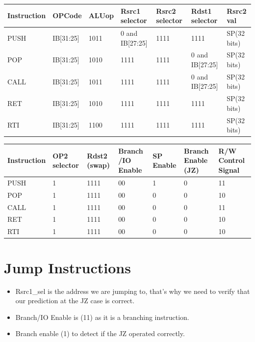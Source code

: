 \documentclass[12pt]{report}
\begin{document}
\begin{center}
\begin{tabular}{||p{20mm}| p{15mm}| p{15mm}| p{15mm}| p{15mm}| p{15mm}| p{15mm}||} 
\hline
Instruction & OPCode & ALUop & Rsrc1 selector & Rsrc2 selector & Rdst1 selector & Rsrc2 val \\ [0.5ex] 
\hline\hline
PUSH & IB[31:25] & 1011 & 0 and IB[27:25] & 1111 & 1111 & SP(32 bits) \\
\hline
POP & IB[31:25] & 1010 & 1111 & 1111 & 0 and IB[27:25] & SP(32 bits) \\
\hline
CALL & IB[31:25] & 1011 & 1111 & 1111 & 0 and IB[27:25] & SP(32 bits) \\
\hline
RET & IB[31:25] & 1010 & 1111 & 1111 & 1111 & SP(32 bits) \\
\hline
RTI & IB[31:25] & 1100 & 1111 & 1111 & 1111 & SP(32 bits) \\
\hline
\end{tabular}
\end{center}

\begin{center}
\begin{tabular}{||p{20mm}| p{15mm}| p{15mm}| p{15mm}| p{15mm}| p{15mm}| p{15mm}||} 
\hline
Instruction & OP2 selector & Rdst2 (swap) & Branch /IO Enable & SP Enable & Branch Enable (JZ) & R/W Control Signal \\ [0.5ex] 
\hline\hline
PUSH & 1 & 1111 & 00 & 1 & 0 & 11 \\
\hline
POP & 1 & 1111 & 00 & 0 & 0 & 10 \\
\hline
CALL & 1 & 1111 & 00 & 0 & 0 & 11 \\
\hline
RET & 1 & 1111 & 00 & 0 & 0 & 10 \\
\hline
RTI & 1 & 1111 & 00 & 0 & 0 & 10 \\
\hline
\end{tabular}
\end{center}

\section{Jump Instructions}
\begin{itemize}
    \item Rsrc1\_sel is the address we are jumping to, that's why we need to verify that our prediction at the JZ case is correct.
    \item Branch/IO Enable is (11) as it is a branching instruction.
    \item Branch enable (1) to detect if the JZ operated correctly.
\end{itemize}
\end{document}
